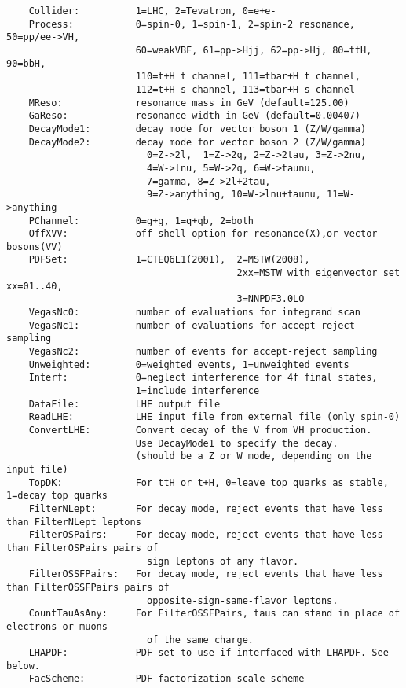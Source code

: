 \documentclass[aps,superscriptaddress,nofootinbib]{revtex4}
\begin{document}
\begin{verbatim}
    Collider:          1=LHC, 2=Tevatron, 0=e+e-
    Process:           0=spin-0, 1=spin-1, 2=spin-2 resonance, 50=pp/ee->VH,
                       60=weakVBF, 61=pp->Hjj, 62=pp->Hj, 80=ttH, 90=bbH,
                       110=t+H t channel, 111=tbar+H t channel,
                       112=t+H s channel, 113=tbar+H s channel
    MReso:             resonance mass in GeV (default=125.00)
    GaReso:            resonance width in GeV (default=0.00407)
    DecayMode1:        decay mode for vector boson 1 (Z/W/gamma)
    DecayMode2:        decay mode for vector boson 2 (Z/W/gamma)
                         0=Z->2l,  1=Z->2q, 2=Z->2tau, 3=Z->2nu,
                         4=W->lnu, 5=W->2q, 6=W->taunu,
                         7=gamma, 8=Z->2l+2tau,
                         9=Z->anything, 10=W->lnu+taunu, 11=W->anything
    PChannel:          0=g+g, 1=q+qb, 2=both
    OffXVV:            off-shell option for resonance(X),or vector bosons(VV)
    PDFSet:            1=CTEQ6L1(2001),  2=MSTW(2008),
                                         2xx=MSTW with eigenvector set xx=01..40,
                                         3=NNPDF3.0LO
    VegasNc0:          number of evaluations for integrand scan
    VegasNc1:          number of evaluations for accept-reject sampling
    VegasNc2:          number of events for accept-reject sampling
    Unweighted:        0=weighted events, 1=unweighted events
    Interf:            0=neglect interference for 4f final states,
                       1=include interference
    DataFile:          LHE output file
    ReadLHE:           LHE input file from external file (only spin-0)
    ConvertLHE:        Convert decay of the V from VH production.
                       Use DecayMode1 to specify the decay.
                       (should be a Z or W mode, depending on the input file)
    TopDK:             For ttH or t+H, 0=leave top quarks as stable, 1=decay top quarks
    FilterNLept:       For decay mode, reject events that have less than FilterNLept leptons
    FilterOSPairs:     For decay mode, reject events that have less than FilterOSPairs pairs of
                         sign leptons of any flavor.
    FilterOSSFPairs:   For decay mode, reject events that have less than FilterOSSFPairs pairs of
                         opposite-sign-same-flavor leptons.
    CountTauAsAny:     For FilterOSSFPairs, taus can stand in place of electrons or muons
                         of the same charge.
    LHAPDF:            PDF set to use if interfaced with LHAPDF. See below.
    FacScheme:         PDF factorization scale scheme

\end{verbatim}
\end{document}
